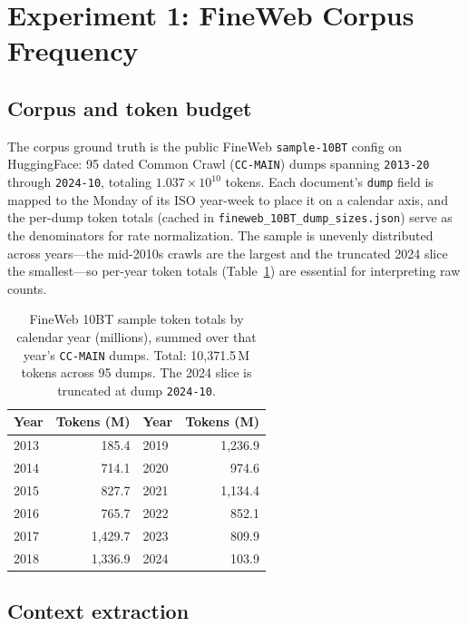 \documentclass[11pt]{article}
\begin{document}
\section{Experiment 1: FineWeb Corpus Frequency}%
\label{app:exp1}

\subsection{Corpus and token budget}

The corpus ground truth is the public FineWeb \citep{penedo2024the} \texttt{sample-10BT} config on HuggingFace: 95 dated Common Crawl (\texttt{CC-MAIN}) dumps spanning \texttt{2013-20} through \texttt{2024-10}, totaling $1.037\times10^{10}$ tokens. Each document's \texttt{dump} field is mapped to the Monday of its ISO year-week to place it on a calendar axis, and the per-dump token totals (cached in \texttt{fineweb\_10BT\_dump\_sizes.json}) serve as the denominators for rate normalization. The sample is unevenly distributed across years---the mid-2010s crawls are the largest and the truncated 2024 slice the smallest---so per-year token totals (Table~\ref{tab:tokens}) are essential for interpreting raw counts. %

\begin{table}[htbp]
\centering
\small
\begin{tabular}{lr@{\hskip 2em}lr}
\toprule
Year & Tokens (M) & Year & Tokens (M) \\
\midrule
2013 & 185.4  & 2019 & 1{,}236.9 \\
2014 & 714.1  & 2020 & 974.6 \\
2015 & 827.7  & 2021 & 1{,}134.4 \\
2016 & 765.7  & 2022 & 852.1 \\
2017 & 1{,}429.7 & 2023 & 809.9 \\
2018 & 1{,}336.9 & 2024 & 103.9 \\
\bottomrule
\end{tabular}
\caption{FineWeb 10BT sample token totals by calendar year (millions), summed over that year's \texttt{CC-MAIN} dumps. Total: 10{,}371.5\,M tokens across 95 dumps. The 2024 slice is truncated at dump \texttt{2024-10}.}%
\label{tab:tokens}
\end{table}

\subsection{Context extraction}
\end{document}
